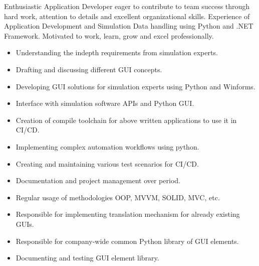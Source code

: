 \documentclass[10pt,a4paper,ragged2e,withhyper]{altacv}
\begin{document}
\begin{paracol}{2}

\begin{flushleft}
Enthusiastic Application Developer eager to contribute to team success through hard work, attention to details and excellent organizational skills. 
Experience of Application Development and Simulation Data handling using Python and .NET Framework. 
Motivated to work, learn, grow and excel professionally.
\end{flushleft}

\divider
{}
\begin{itemize}
\item Understanding the indepth requirements from simulation experts.
\item Drafting and discussing different GUI concepts. 
\item Developing GUI solutions for simulation experts using Python and Winforms.
\item Interface with simulation software APIs and Python GUI.
\item Creation of compile toolchain for above written applications to use it in CI/CD.
\item Implementing complex automation workflows using python.
\item Creating and maintaining various test scenarios for CI/CD.
\item Documentation and project management over period.
\item Regular usage of methodologies OOP, MVVM, SOLID, MVC, etc.  
\end{itemize}
\divider
{}
\begin{itemize}
\item Responsible for implementing translation mechanism for already existing GUIs. 
\item Responsible for company-wide common Python library of GUI elements.
\item Documenting and testing GUI element library.
\end{itemize}
\divider

\begin{itemize}


\end{itemize}
\end{paracol}
\end{document}
